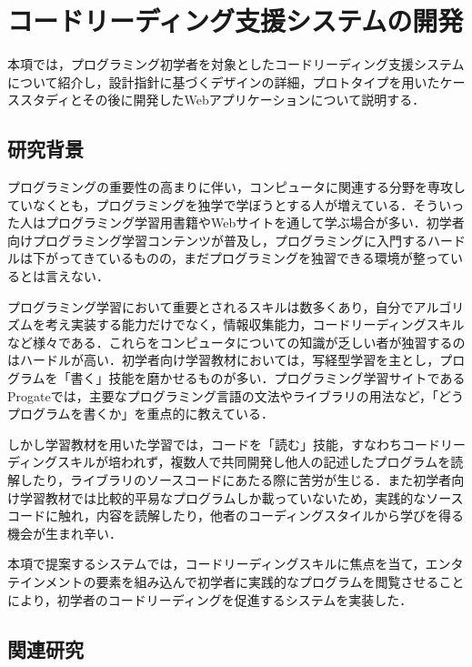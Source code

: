 \section{コードリーディング支援システムの開発}

本項では，プログラミング初学者を対象としたコードリーディング支援システムについて紹介し，設計指針に基づくデザインの詳細，プロトタイプを用いたケーススタディとその後に開発したWebアプリケーションについて説明する．

\subsection{研究背景}
プログラミングの重要性の高まりに伴い，コンピュータに関連する分野を専攻していなくとも，プログラミングを独学で学ぼうとする人が増えている．そういった人はプログラミング学習用書籍やWebサイトを通して学ぶ場合が多い．初学者向けプログラミング学習コンテンツが普及し，プログラミングに入門するハードルは下がってきているものの，まだプログラミングを独習できる環境が整っているとは言えない．

プログラミング学習において重要とされるスキルは数多くあり，自分でアルゴリズムを考え実装する能力だけでなく，情報収集能力，コードリーディングスキルなど様々である．これらをコンピュータについての知識が乏しい者が独習するのはハードルが高い．初学者向け学習教材においては，写経型学習を主とし，プログラムを「書く」技能を磨かせるものが多い．プログラミング学習サイトであるProgate\cite{progate}では，主要なプログラミング言語の文法やライブラリの用法など，「どうプログラムを書くか」を重点的に教えている．


しかし学習教材を用いた学習では，コードを「読む」技能，すなわちコードリーディングスキルが培われず，複数人で共同開発し他人の記述したプログラムを読解したり，ライブラリのソースコードにあたる際に苦労が生じる．また初学者向け学習教材では比較的平易なプログラムしか載っていないため，実践的なソースコードに触れ，内容を読解したり，他者のコーディングスタイルから学びを得る機会が生まれ辛い．

本項で提案するシステムでは，コードリーディングスキルに焦点を当て，エンタテインメントの要素を組み込んで初学者に実践的なプログラムを閲覧させることにより，初学者のコードリーディングを促進するシステムを実装した．
\subsection{関連研究}

